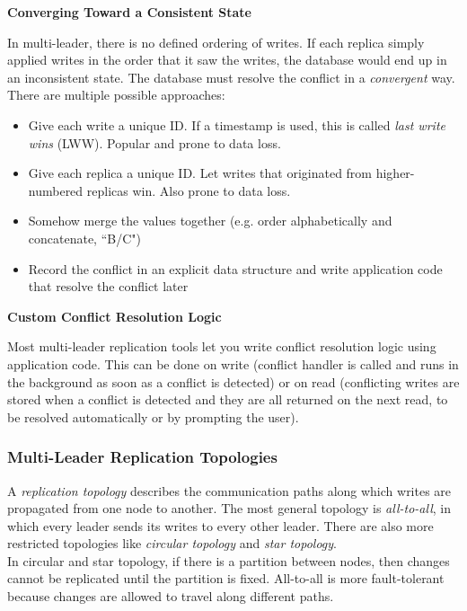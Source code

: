 \documentclass[12pt, titlepage]{article}
\newcommand{\subsubsubsection}[1]{\small \textbf{#1} \medskip}
\begin{document}
\subsubsubsection{Converging Toward a Consistent State}

In multi-leader, there is no defined ordering of writes. If each replica simply applied writes in the order that it saw the writes, the database would end up in an inconsistent state. The database must resolve the conflict in a \textit{convergent} way. There are multiple possible approaches:

\begin{itemize}
	\item Give each write a unique ID. If a timestamp is used, this is called \textit{last write wins} (LWW). Popular and prone to data loss.
	\item Give each replica a unique ID. Let writes that originated from higher-numbered replicas win. Also prone to data loss.
	\item Somehow merge the values together (e.g. order alphabetically and concatenate, ``B/C")
	\item Record the conflict in an explicit data structure and write application code that resolve the conflict later
\end{itemize}

\subsubsubsection{Custom Conflict Resolution Logic}

Most multi-leader replication tools let you write conflict resolution logic using application code. This can be done on write (conflict handler is called and runs in the background as soon as a conflict is detected) or on read (conflicting writes are stored when a conflict is detected and they are all returned on the next read, to be resolved automatically or by prompting the user).

\subsubsection{Multi-Leader Replication Topologies}

A \textit{replication topology} describes the communication paths along which writes are propagated from one node to another. The most general topology is \textit{all-to-all}, in which every leader sends its writes to every other leader. There are also more restricted topologies like \textit{circular topology} and \textit{star topology}. \\

In circular and star topology, if there is a partition between nodes, then changes cannot be replicated until the partition is fixed. All-to-all is more fault-tolerant because changes are allowed to travel along different paths. \\
\end{document}

